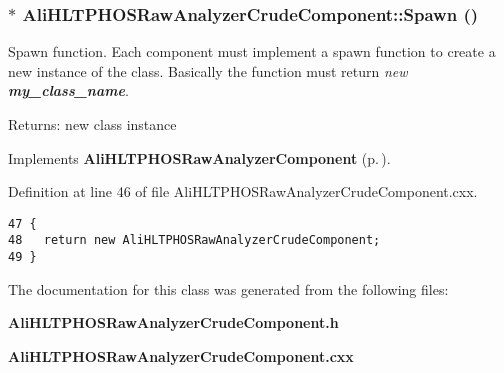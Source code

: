 \subsubsection{ $\ast$ Ali\-HLTPHOSRaw\-Analyzer\-Crude\-Component::Spawn ()\hspace{0.3cm}{\tt  [virtual]}}\label{classAliHLTPHOSRawAnalyzerCrudeComponent_a5}


Spawn function. Each component must implement a spawn function to create a new instance of the class. Basically the function must return {\em new {\bf my\_\-class\_\-name}\/}. \begin{Desc}
\item[Returns:]new class instance \end{Desc}


Implements {\bf Ali\-HLTPHOSRaw\-Analyzer\-Component} {\rm (p.\,\pageref{classAliHLTPHOSRawAnalyzerComponent_a16})}.

Definition at line 46 of file Ali\-HLTPHOSRaw\-Analyzer\-Crude\-Component.cxx.

\footnotesize\begin{verbatim}47 {
48   return new AliHLTPHOSRawAnalyzerCrudeComponent;
49 }
\end{verbatim}\normalsize 




The documentation for this class was generated from the following files:\begin{CompactItemize}
\item 
{\bf Ali\-HLTPHOSRaw\-Analyzer\-Crude\-Component.h}\item 
{\bf Ali\-HLTPHOSRaw\-Analyzer\-Crude\-Component.cxx}\end{CompactItemize}
